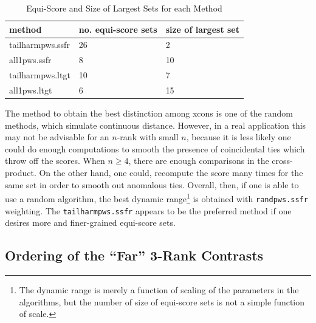\documentclass{article}
\begin{document}
\begin{table}[h!]
\centering
\begin{longtable}{| l | l | l | }
\hline
\textbf{method} & \textbf{no. equi-score sets} & \textbf{size of largest set} \\
\hline 
\hline 
tailharmpws.ssfr & 26 & 2 \\
\hline
all1pws.ssfr & 8 & 10 \\
\hline
tailharmpws.ltgt & 10 & 7 \\
\hline
all1pws.ltgt & 6 & 15 \\
\hline
\end{longtable}
\caption{Equi-Score and Size of Largest Sets for each Method}
\end{table}

The method to obtain the best distinction among xcons is one of the random methods, which simulate continuous distance. However, in a real application this may not be advisable for an $n$-rank with small $n$, because it is less likely one could do enough computations to smooth the presence of coincidental ties which throw off the scores. When $n \geq 4$, there are enough comparisons in the cross-product. On the other hand, one could, recompute the score many times for the same set in order to smooth out anomalous ties. Overall, then, if one is able to use a random algorithm, the best dynamic range\footnote{The dynamic range is merely a function of scaling of the parameters in the algorithms, but the number of size of equi-score sets is not a simple function of scale.} is obtained with \texttt{randpws.ssfr} weighting. The \texttt{tailharmpws.ssfr} appears to be the preferred method if one desires more and finer-grained equi-score sets. 

\subsection{Ordering of the ``Far'' 3-Rank Contrasts}
\end{document}
